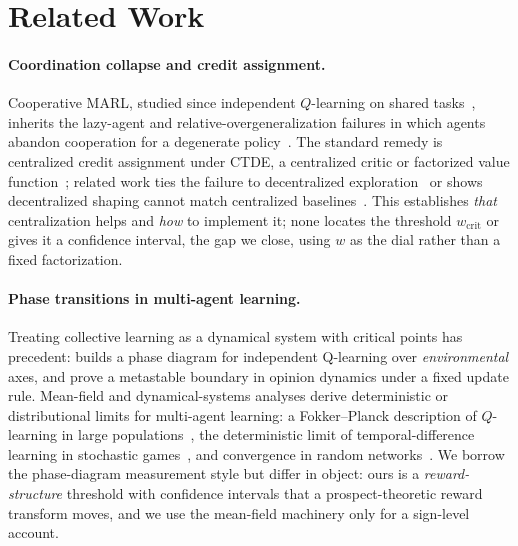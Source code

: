 \documentclass[letterpaper]{article} %
\theoremstyle{plain}
\newcommand{\wcrit}{w_{\mathrm{crit}}}
\begin{document}
\section{Related Work}
\label{sec:related}

\paragraph{Coordination collapse and credit assignment.}
Cooperative MARL, studied since independent $Q$-learning on shared
tasks~\citep{tan1993multi,busoniu2008comprehensive}, inherits the lazy-agent and
relative-overgeneralization failures in which agents abandon cooperation for a degenerate
policy~\citep{liu2023lazy,peng2023curo,tampuu2017multiagent}. The standard remedy is centralized
credit assignment under CTDE, a centralized critic or factorized value
function~\citep{lowe2017multi,yu2022surprising,sunehag2018vdn,rashid2018qmix,foerster2018counterfactual,son2019qtran};
related work ties the failure to
decentralized exploration~\citep{weng2026} or shows decentralized shaping cannot match centralized
baselines~\citep{dmarl2025}. This establishes \emph{that} centralization helps and \emph{how} to
implement it; none locates the threshold $\wcrit$ or gives it a confidence interval, the gap we
close, using $w$ as the dial rather than a fixed factorization.

\paragraph{Phase transitions in multi-agent learning.}
Treating collective learning as a dynamical system with critical points has
precedent: \citet{yamaguchi2025} builds a phase diagram for independent Q-learning over
\emph{environmental} axes, and \citet{capannoli2026phase} prove a metastable boundary in opinion
dynamics under a fixed update rule. Mean-field and dynamical-systems analyses derive deterministic
or distributional limits for multi-agent learning: a Fokker--Planck description of $Q$-learning in
large populations~\citep{hu2019meanfield}, the deterministic limit of temporal-difference learning
in stochastic games~\citep{barfuss2019deterministic}, and convergence in random
networks~\citep{hussain2025convergence}. We borrow the phase-diagram measurement style but differ in
object: ours is a \emph{reward-structure} threshold with confidence intervals that a
prospect-theoretic reward transform moves, and we use the mean-field machinery only for a
sign-level account.
\end{document}
